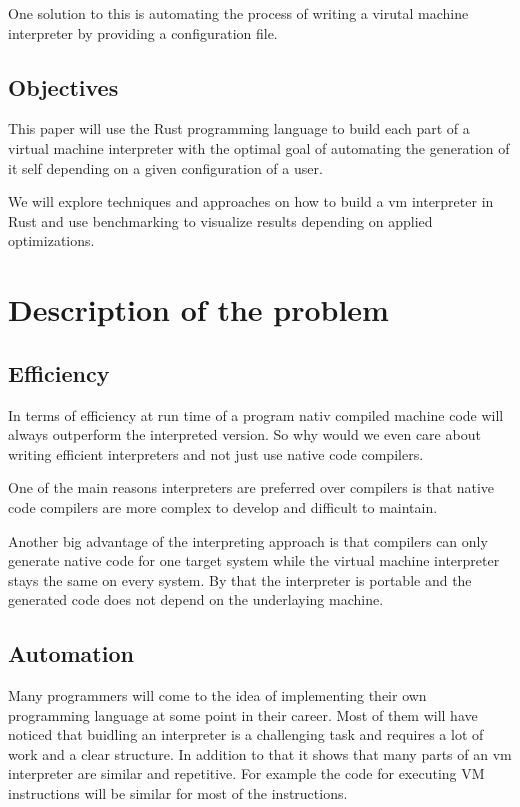 \documentclass{article}
\begin{document}
One solution to this is automating the process of writing a virutal machine interpreter
by providing a configuration file.

\subsection{Objectives}
This paper will use the Rust programming language to build each part of a virtual machine 
interpreter with the optimal goal of automating the generation of it self depending on
a given configuration of a user.

We will explore techniques and approaches on how to build a vm interpreter in Rust and
use benchmarking to visualize results depending on applied optimizations.

\section{Description of the problem}
\subsection{Efficiency}
In terms of efficiency at run time of a program nativ compiled machine code
will always outperform the interpreted version. So why would we even care
about writing efficient interpreters and not just use native code compilers.

One of the main reasons interpreters are preferred over compilers is that 
native code compilers are more complex to develop and difficult to maintain.
~\cite{structure_and_performance}

Another big advantage of the interpreting approach is that compilers can only
generate native code for one target system while the virtual machine
interpreter stays the same on every system. By that the interpreter is portable
and the generated code does not depend on the underlaying machine.

\subsection{Automation}
Many programmers will come to the idea of implementing their own programming
language at some point in their career. Most of them will have noticed that
buidling an interpreter is a challenging task and requires a lot of work and
a clear structure. In addition to that it shows that many parts of an vm
interpreter are similar and repetitive. For example the code for executing 
VM instructions will be similar for most of the instructions. ~\cite{vmgen}
\end{document}
